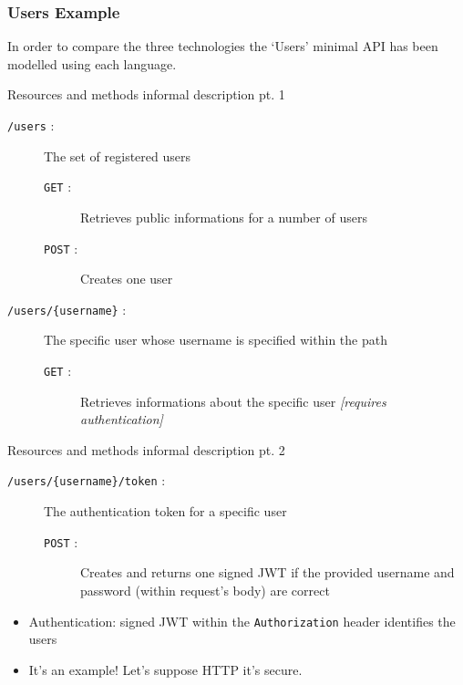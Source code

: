 \begin{frame}[allowframebreaks]
	\frametitle{Users Example}
	
	In order to compare the three technologies the `Users' minimal API has been modelled using each language.
	
	\begin{block}{Resources and methods informal description pt. 1}
		\begin{description}
			\item[\texttt{/users} :] The set of registered users
			\begin{description}
				\item[\texttt{GET} :] Retrieves public informations for a number of users
				\item[\texttt{POST} :] Creates one user
			\end{description}
			\item[\texttt{/users/\{username\}} :] The specific user whose username is specified within the path
			\begin{description}
				\item[\texttt{GET} :] Retrieves informations about the specific user \emph{[requires authentication]}
			\end{description}
		\end{description}
	\end{block}
	
	\framebreak
	
	\begin{block}{Resources and methods informal description pt. 2}
		\begin{description}
			\item[\texttt{/users/\{username\}/token} :] The authentication token for a specific user
			\begin{description}
				\item[\texttt{POST} :] Creates and returns one signed JWT if the provided username and password (within request's body) are correct
			\end{description}
		\end{description}
		\vspace{5mm}
		\begin{itemize}
			\item Authentication: signed JWT within the \texttt{Authorization} header identifies the users 
			\item It's an example! Let's suppose HTTP it's secure.
		\end{itemize}
	\end{block}
	
	
	
\end{frame}